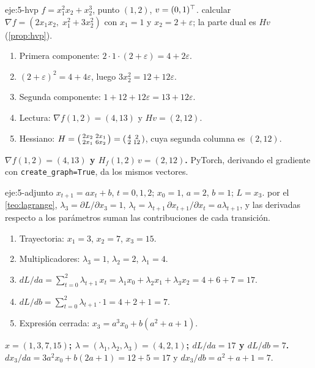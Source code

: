 \begin{solucion}{eje:5-hvp}
\datos $f=x_1^{2}x_2+x_2^{3}$, punto $(1,2)$, $v=(0,1)^{\top}$.
\planteamiento calcular $\nabla f=(2x_1x_2,\;x_1^{2}+3x_2^{2})$ con $x_1=1$ y $x_2=2+\varepsilon$; la parte dual es $Hv$ (\cref{prop:hvp}).
\pasos
\begin{enumerate}[label=\arabic*.]
  \item Primera componente: $2\cdot 1\cdot(2+\varepsilon)=4+2\varepsilon$.
  \item $(2+\varepsilon)^{2}=4+4\varepsilon$, luego $3x_2^{2}=12+12\varepsilon$.
  \item Segunda componente: $1+12+12\varepsilon=13+12\varepsilon$.
  \item Lectura: $\nabla f(1,2)=(4,13)$ y $Hv=(2,12)$.
  \item Hessiano: $H=\begin{psmallmatrix}2x_2&2x_1\\2x_1&6x_2\end{psmallmatrix}=\begin{psmallmatrix}4&2\\2&12\end{psmallmatrix}$, cuya segunda columna es $(2,12)$.
\end{enumerate}
\resultado \textbf{$\nabla f(1,2)=(4,13)$ y $H_f(1,2)\,v=(2,12)$.}
\comprobacion PyTorch, derivando el gradiente con \texttt{create\_graph=True}, da los mismos vectores.
\end{solucion}

\begin{solucion}{eje:5-adjunto}
\datos $x_{t+1}=ax_t+b$, $t=0,1,2$; $x_0=1$, $a=2$, $b=1$; $L=x_3$.
\planteamiento por el \cref{teo:lagrange}, $\lambda_3=\partial L/\partial x_3=1$, $\lambda_t=\lambda_{t+1}\,\partial x_{t+1}/\partial x_t=a\lambda_{t+1}$, y las derivadas respecto a los parámetros suman las contribuciones de cada transición.
\pasos
\begin{enumerate}[label=\arabic*.]
  \item Trayectoria: $x_1=3$, $x_2=7$, $x_3=15$.
  \item Multiplicadores: $\lambda_3=1$, $\lambda_2=2$, $\lambda_1=4$.
  \item $dL/da=\sum_{t=0}^{2}\lambda_{t+1}\,x_t=\lambda_1x_0+\lambda_2x_1+\lambda_3x_2=4+6+7=17$.
  \item $dL/db=\sum_{t=0}^{2}\lambda_{t+1}\cdot 1=4+2+1=7$.
  \item Expresión cerrada: $x_3=a^{3}x_0+b(a^{2}+a+1)$.
\end{enumerate}
\resultado \textbf{$x=(1,3,7,15)$; $\lambda=(\lambda_1,\lambda_2,\lambda_3)=(4,2,1)$; $dL/da=17$ y $dL/db=7$.}
\comprobacion $dx_3/da=3a^{2}x_0+b(2a+1)=12+5=17$ y $dx_3/db=a^{2}+a+1=7$.
\end{solucion}

